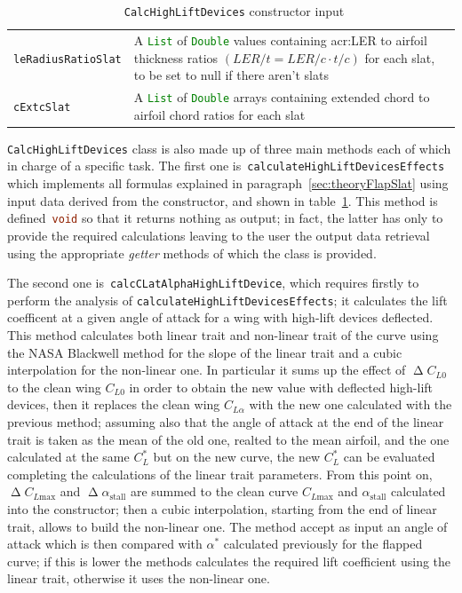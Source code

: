 \begin{table}[!t]
{\begin{tabular}{p{0.2\linewidth}p{0.8\linewidth}}
\lstinline[language=Java]!leRadiusRatioSlat! & A \lstinline[language=Java]!List! of  \lstinline[language=Java]!Double! values containing \gls{acr:LER} to airfoil thickness ratios $\left(LER/t=LER/c\cdot t/c\right)$ for each slat, to be set to null if there aren't slats \\  [0.2cm]
\lstinline[language=Java]!cExtcSlat! & A \lstinline[language=Java]!List! of  \lstinline[language=Java]!Double! arrays containing extended chord to airfoil chord ratios for each slat \\ 
\bottomrule
\end{tabular}
}
\caption{~\lstinline[language=Java]!CalcHighLiftDevices! constructor input}
\label{table:CalcHighLiftConstructor}
\end{table}

\bigskip
\noindent
\lstinline[language=Java]!CalcHighLiftDevices! class is also made up of three main methods each of which in charge of a specific task. 
%
\noindent
The first one is~\lstinline[language=Java]!calculateHighLiftDevicesEffects! which implements all formulas explained in paragraph~\ref{sec:theoryFlapSlat} using input data derived from the constructor, and shown in table~\ref{table:CalcHighLiftConstructor}. This method is defined~\lstinline[language=Java]!void! so that it returns nothing as output; in fact, the latter has only to provide the required calculations leaving to the user the output data retrieval using the appropriate \emph{getter} methods of which the class is provided. 

\bigskip
\noindent
The second one is~\lstinline[language=Java]!calcCLatAlphaHighLiftDevice!, which requires firstly to perform the analysis of \lstinline[language=Java]!calculateHighLiftDevicesEffects!; it calculates the lift coefficent at a given angle of attack for a wing with high-lift devices deflected. This method calculates both linear trait and non-linear trait of the curve using the NASA Blackwell method for the slope of the linear trait and a cubic interpolation for the non-linear one. 
%
In particular it sums up the effect of $\upDelta C_{L0}$ to the clean wing $C_{L0}$ in order to obtain the new value with deflected high-lift devices, then it replaces the clean wing $C_{L\alpha}$ with the new one calculated with the previous method; assuming also that the angle of attack at the end of the linear trait is taken as the mean of the old one, realted to the mean airfoil, and the one calculated at the same $C_L^*$ but on the new curve, the new $C_L^*$  can be evaluated completing the calculations of the linear trait parameters. From this point on, $\upDelta C_{L\text{max}}$ and $\upDelta\alpha_{\text{stall}}$ are summed to the clean curve $C_{L\text{max}}$ and $\alpha_{\text{stall}}$ calculated into the constructor; then a cubic interpolation, starting from the end of linear trait, allows to build the non-linear one.
%
The method accept as input an angle of attack which is then compared with $\alpha^*$ calculated previously for the flapped curve; if this is lower the methods calculates the required lift coefficient using the linear trait, otherwise it uses the non-linear one.


